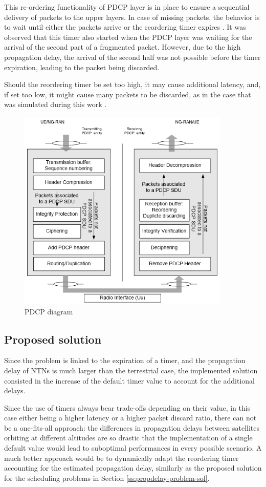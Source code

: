 This re-ordering functionality of \ac{PDCP} layer is in place to ensure a sequential delivery of packets to the upper layers. In case of missing packets, the behavior is to wait until either the packets arrive or the reordering timer expires \cite{efficient-reassembly-pdcp}. It was observed that this timer also started when the \ac{PDCP} layer was waiting for the arrival of the second part of a fragmented packet. However, due to the high propagation delay, the arrival of the second half was not possible before the timer expiration, leading to the packet being discarded.

Should the reordering timer be set too high, it may cause additional latency, and, if set too low, it might cause many packets to be discarded, as in the case that was simulated during this work \cite{efficient-reassembly-pdcp}.

\begin{figure}[ht]
    \centering
    \includegraphics[width=0.9\textwidth]{res/pdcp-functionality.png}
    \caption{PDCP diagram \cite{pdcp-spec-3gpp}}
    \label{fig:pdcp-functionalities}
\end{figure}

\subsection{Proposed solution}
Since the problem is linked to the expiration of a timer, and the propagation delay of \ac{NTNs} is much larger than the terrestrial case, the implemented solution consisted in the increase of the default timer value to account for the additional delays.

Since the use of timers always bear trade-offs depending on their value, in this case either being a higher latency or a higher packet discard ratio, there can not be a one-fits-all approach: the differences in propagation delays between satellites orbiting at different altitudes are so drastic that the implementation of a single default value would lead to suboptimal performances in every possible scenario. A much better approach would be to dynamically adapt the reordering timer accounting for the estimated propagation delay, similarly as the proposed solution for the scheduling problems in Section \ref{ss:propdelay-problem-sol}.